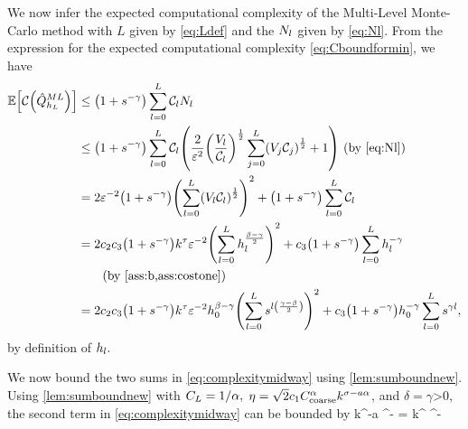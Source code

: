 We now infer the expected computational complexity of the Multi-Level Monte-Carlo meth\-od with $L$ given by \eqref{eq:Ldef} and the $N_{l}$ given by \eqref{eq:Nl}. From the expression for the expected computational complexity \cref{eq:Cboundformin}, we have
\begin{align}
\EXP{\Cost{\QhatMLhL}} &\leq \mleft(1+s^{-\gamma}\mright)\sum_{l=0}^{L} \Cl \Nl\nonumber\\
&\leq \mleft(1+s^{-\gamma}\mright)\sum_{l=0}^L \Cl \mleft(\frac2{\eps^{2}} \mleft(\frac{\Vl}{\Cl}\mright)^{\half}\sum_{j=0}^L \mleft(\Vj\Costj\mright)^{\half} + 1\mright) \text{ (by \eqref{eq:Nl})}\nonumber\\
&= 2\eps^{-2}\mleft(1+s^{-\gamma}\mright)\mleft(\sum_{l=0}^L\mleft(\Vl\Cl\mright)^{\half}\mright)^2 + \mleft(1+s^{-\gamma}\mright)\sum_{l=0}^L \Cl\nonumber\\
&= 2 \ct \cth \mleft(1+s^{-\gamma}\mright)k^{\tau}\eps^{-2} \mleft(\sum_{l=0}^L \hl^{\frac{\beta-\gamma}2}\mright)^2 + \cth \mleft(1+s^{-\gamma}\mright) \sum_{l=0}^L \hl^{-\gamma}\nonumber\\
&\quad\quad\text{(by \cref{ass:b,ass:costone})}\nonumber\\
&= 2 \ct\cth \mleft(1+s^{-\gamma}\mright)k^{\tau}\eps^{-2}\hz^{\beta-\gamma}\mleft(\sum_{l=0}^L s^{l\mleft(\frac{\gamma-\beta}2\mright)}\mright)^2 + \cth\mleft(1+s^{-\gamma}\mright) \hz^{-\gamma} \sum_{l=0}^L s^{\gamma l},\label{eq:complexitymidway}
\end{align}
by definition of $h_{l}.$

We now bound the two sums in \cref{eq:complexitymidway} using \cref{lem:sumboundnew}. Using \cref{lem:sumboundnew} with $C_{L} = 1/\alpha,$ $\eta = \sqrt{2}c_{1}C_{\mathrm{coarse}}^\alpha k^{\sigma - a\alpha}$, and $\delta = \gamma$>0, the second term in \eqref{eq:complexitymidway} can be bounded by %
\beq\label{eq:firstterm}
\cth{} k^{\frac{\gamma\sigma}\alpha-a\gamma} \eps^{-\frac\gamma\alpha}
=  k^{\frac{\gamma\sigma}\alpha} \eps^{-\frac\gamma\alpha}
\eeq

